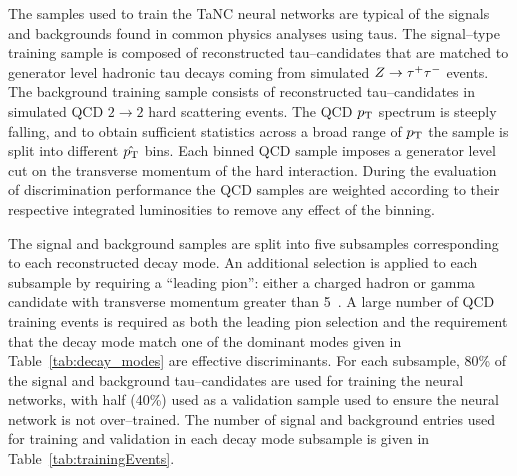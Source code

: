 The samples used to train the TaNC neural networks are typical of the signals
and backgrounds found in common physics analyses using taus.  The signal--type
training sample is composed of reconstructed tau--candidates that are matched to
generator level hadronic tau decays coming from simulated $\mbox{\ensuremath{Z\to\tau^+\tau^-}}$ events.  The
background training sample consists of reconstructed tau--candidates in
simulated QCD $2\rightarrow2$ hard scattering events.  The QCD $p_{\mathrm{T}}$ spectrum is
steeply falling, and to obtain sufficient statistics across a broad range of
$p_{\mathrm{T}}$ the sample is split into different $\hat {p_{\mathrm{T}}}$ bins.  Each binned QCD
sample imposes a generator level cut on the transverse momentum of the hard
interaction.  During the evaluation of discrimination performance the QCD
samples are weighted according to their respective integrated luminosities to
remove any effect of the binning.

The signal and background samples are split into five subsamples corresponding
to each reconstructed decay mode.  An additional selection is applied to each
subsample by requiring a ``leading pion'': either a charged hadron or gamma
candidate with transverse momentum greater than 5~\GeVc.  A large number of QCD
training events is required as both the leading pion selection and the
requirement that the decay mode match one of the dominant modes given in
Table~\ref{tab:decay_modes} are effective discriminants.  For each subsample,
80\% of the signal and background tau--candidates are used for training the
neural networks, with half (40\%) used as a
validation sample used to ensure the neural network is not over--trained. The
number of signal and background entries used for training and validation in each
decay mode subsample is given in Table~\ref{tab:trainingEvents}.


